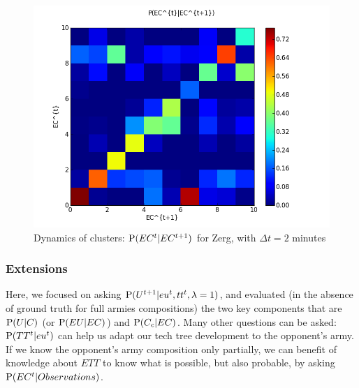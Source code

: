 \begin{figure}[h]
\centerline{\includegraphics[width=0.76\columnwidth]{images/Z_EC_knowing_ECnext.png}}
\caption{Dynamics of clusters: $\mathrm{P}(EC^t|EC^{t+1})$ for Zerg, with $\Delta t = 2$ minutes}
\label{ecknowingecnext}
\end{figure}



\subsubsection{Extensions}

Here, we focused on asking $\mathrm{P}(U^{t+1}|eu^t, tt^t, \lambda=1)$, and evaluated (in the absence of ground truth for full armies compositions) the two key components that are $\mathrm{P}(U|C)$ (or $\mathrm{P}(EU|EC)$) and $\mathrm{P}(C_c|EC)$. Many other questions can be asked: $\mathrm{P}(TT^t|eu^t)$ can help us adapt our tech tree development to the opponent's army. If we know the opponent's army composition only partially, we can benefit of knowledge about $ETT$ to know what is possible, but also probable, by asking $\mathrm{P}(EC^t|Observations)$.


